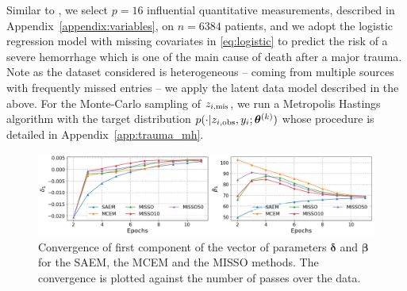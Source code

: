 \documentclass[11pt]{article}
\theoremstyle{t}
\begin{document}
Similar to \citep{jiang2018logistic}, we select $p = 16$ influential quantitative measurements, described in Appendix~\ref{appendix:variables}, on $n = 6384$ patients, and we adopt
the logistic regression model with missing covariates in \eqref{eq:logistic} to predict the risk of a severe hemorrhage which is one of the main cause of death after a major trauma.
Note as the dataset considered is heterogeneous -- coming from multiple sources with frequently missed entries -- we apply the latent data model described in the above.
For the Monte-Carlo sampling of $z_{i,\mis}$, we run a Metropolis Hastings algorithm with the target distribution $p( \cdot |z_{i,\obs}, y_i; \hp{k})$ whose procedure is detailed in Appendix~\ref{app:trauma_mh}.

\begin{figure}[H]
\includegraphics[width=\textwidth]{pic_paper/traumabasenoexp.png}\vspace{-.2cm}
\caption{Convergence of first component of the vector of parameters ${\bm \delta}$ and ${\bm \beta}$ for the SAEM, the MCEM and the MISSO methods. The convergence is plotted against the number of passes over the data.}\vspace{-.2cm}
\label{fig:misso_trauma}
\end{figure}
\end{document}
